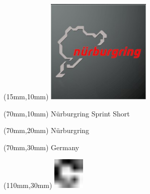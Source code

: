 \null\newpage
\begin{textblock*}{50mm}(15mm,10mm)%
\includegraphics[width=50mm]{LG/2015-05-20_00089.png}
\end{textblock*}
\begin{textblock*}{130mm}(70mm,10mm)%
{\fontsize{20}{20}\selectfont Nürburgring Sprint Short}\\
\end{textblock*}
\begin{textblock*}{120mm}(70mm,20mm)%
{\fontsize{16}{16}\selectfont Nürburgring}\\
\end{textblock*}
\begin{textblock*}{120mm}(70mm,30mm)%
{\fontsize{12}{12}\selectfont Germany}
\end{textblock*}
\begin{textblock*}{30mm}(110mm,30mm)%
\centering
\includegraphics[height=15mm]{icons/fa-rotate-right.pdf}
\end{textblock*}
